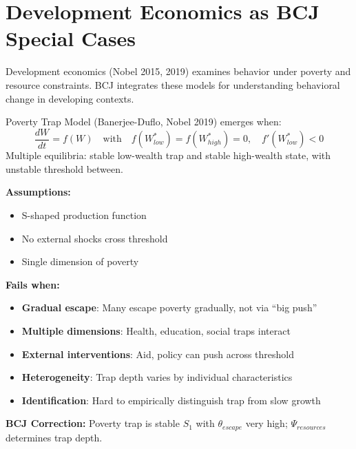 
\section{Development Economics as BCJ Special Cases}
\label{sec:development-economics}

Development economics (Nobel 2015, 2019) examines behavior under poverty and resource constraints. BCJ integrates these models for understanding behavioral change in developing contexts.


\begin{theorem}
\label{thm:poverty-traps}
Poverty Trap Model (Banerjee-Duflo, Nobel 2019) emerges when:
\begin{equation}
\boxed{\frac{dW}{dt} = f(W) \quad \text{with} \quad f(W^*_{low}) = f(W^*_{high}) = 0, \quad f'(W^*_{low}) < 0}
\end{equation}
Multiple equilibria: stable low-wealth trap and stable high-wealth state, with unstable threshold between.
\end{theorem}

\begin{tcolorbox}[colback=red!5!white, colframe=red!75!black, title=Boundary Condition: Where Poverty Trap Model Fails]
\textbf{Assumptions:}
\begin{itemize}[nosep]
\item S-shaped production function
\item No external shocks cross threshold
\item Single dimension of poverty
\end{itemize}

\textbf{Fails when:}
\begin{itemize}[nosep]
\item \textbf{Gradual escape}: Many escape poverty gradually, not via ``big push''
\item \textbf{Multiple dimensions}: Health, education, social traps interact
\item \textbf{External interventions}: Aid, policy can push across threshold
\item \textbf{Heterogeneity}: Trap depth varies by individual characteristics
\item \textbf{Identification}: Hard to empirically distinguish trap from slow growth
\end{itemize}

\textbf{BCJ Correction:} Poverty trap is stable $S_1$ with $\theta_{escape}$ very high; $\Psi_{resources}$ determines trap depth.
\end{tcolorbox}


